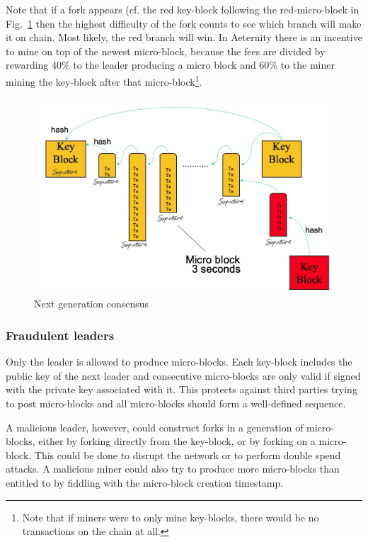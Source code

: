 Note that if a fork appears (cf. the red
key-block following the red-micro-block in Fig.\ \ref{ng-mining} then
the highest difficulty of the fork counts to see which branch will
make it on chain. Most likely, the red branch will win.
In Aeternity there is an incentive to mine
on top of the newest micro-block, because the fees are divided by rewarding 40\%
to the leader producing a micro block and 60\% to the miner mining the key-block after that
micro-block\footnote{Note that if miners
  were to only mine key-blocks, there would be no transactions on the
  chain at all.}.

\begin{figure}
   \includegraphics[scale=0.3]{keymicro.jpg}
   \caption{Next generation consensus}
   \label{ng-mining}
\end{figure}

\subsubsection{Fraudulent leaders}

Only the leader is allowed to produce micro-blocks. Each key-block
includes the  public key of the next leader and consecutive micro-blocks are only valid
if signed with the private key associated with it. This protects against third parties trying
to post micro-blocks and all micro-blocks should form a well-defined
sequence.

A malicious leader, however, could construct forks in a generation of
micro-blocks, either by forking directly from the key-block, or by forking
on a micro-block. This could be done to disrupt the network or to
perform double spend attacks. A malicious miner could also try to
produce more micro-blocks than entitled to by fiddling with the
micro-block creation timestamp.

